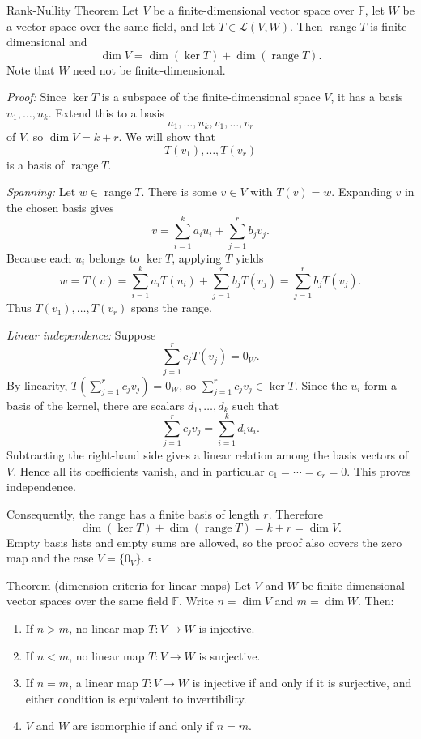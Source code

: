 \documentclass[a4paper,11pt,abstract=true]{scrartcl}
\theoremstyle{dotlessP}
\theoremstyle{dotlessS}
\theoremstyle{remark}
\theoremstyle{definition}
\begin{document}
\begin{mainbox}{Rank-Nullity Theorem}
Let $V$ be a
finite-dimensional vector space over $\mathbb{F}$, let $W$ be a vector
space over the same field, and let $T\in\mathcal{L}(V,W)$. Then
$\operatorname{range}T$ is finite-dimensional and
\[
\dim V=\dim(\ker T)+\dim(\operatorname{range}T).
\]
Note that $W$ need not be
finite-dimensional.
\end{mainbox}

\begin{claim_box}
\textit{Proof:} Since $\ker T$ is a subspace of the finite-dimensional
space $V$, it has a basis $u_1,\ldots,u_k$. Extend this to a basis
\[
u_1,\ldots,u_k,v_1,\ldots,v_r
\]
of $V$, so $\dim V=k+r$. We will show that
\[
T(v_1),\ldots,T(v_r)
\]
is a basis of $\operatorname{range}T$.

\emph{Spanning:} Let $w\in\operatorname{range}T$. There is some $v\in V$
with $T(v)=w$. Expanding $v$ in the chosen basis gives
\[
v=\sum_{i=1}^k a_i u_i+\sum_{j=1}^r b_j v_j.
\]
Because each $u_i$ belongs to $\ker T$, applying $T$ yields
\[
w=T(v)=\sum_{i=1}^k a_i T(u_i)+\sum_{j=1}^r b_j T(v_j)
=\sum_{j=1}^r b_j T(v_j).
\]
Thus $T(v_1),\ldots,T(v_r)$ spans the range.

\emph{Linear independence:} Suppose
\[
\sum_{j=1}^r c_j T(v_j)=0_W.
\]
By linearity, $T(\sum_{j=1}^r c_j v_j)=0_W$, so
$\sum_{j=1}^r c_j v_j\in\ker T$. Since the $u_i$ form a basis of the
kernel, there are scalars $d_1,\ldots,d_k$ such that
\[
\sum_{j=1}^r c_j v_j=\sum_{i=1}^k d_i u_i.
\]
Subtracting the right-hand side gives a linear relation among the basis
vectors of $V$. Hence all its coefficients vanish, and in particular
$c_1=\cdots=c_r=0$. This proves independence.

Consequently, the range has a finite basis of length $r$. Therefore
\[
\dim(\ker T)+\dim(\operatorname{range}T)=k+r=\dim V.
\]
Empty basis lists and empty sums are allowed, so the proof also covers
the zero map and the case $V=\{0_V\}$. \hfill$\square$
\end{claim_box}

%
\label{thm:dimension-criteria}%
\begin{mainbox}{Theorem (dimension criteria for linear maps)}
Let $V$ and
$W$ be finite-dimensional vector spaces over the same field $\mathbb{F}$.
Write $n=\dim V$ and $m=\dim W$. Then:
\begin{enumerate}
    \item If $n>m$, no linear map $T:V\longrightarrow W$ is injective.
    \item If $n<m$, no linear map $T:V\longrightarrow W$ is surjective.
    \item If $n=m$, a linear map $T:V\longrightarrow W$ is injective
    if and only if it is surjective, and either condition is equivalent
    to invertibility.
    \item $V$ and $W$ are isomorphic if and only if $n=m$.
\end{enumerate}
\end{mainbox}
\end{document}
